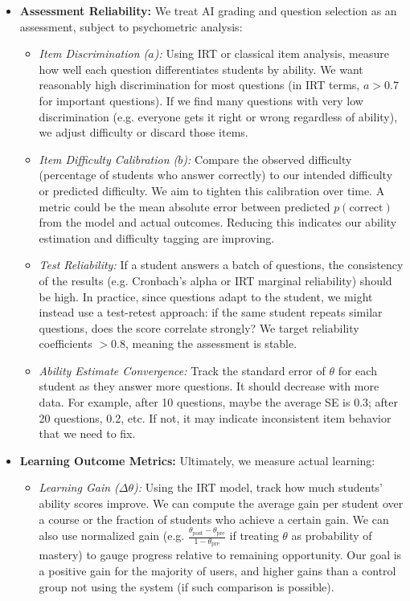 \documentclass[11pt]{article}
\begin{document}
\begin{itemize}
\begin{itemize}
    \end{itemize}
  \item \textbf{Assessment Reliability:} We treat AI grading and question selection as an assessment, subject to psychometric analysis:
    \begin{itemize}
      \item \textit{Item Discrimination ($a$):} Using IRT or classical item analysis, measure how well each question differentiates students by ability. We want reasonably high discrimination for most questions (in IRT terms, $a>0.7$ for important questions). If we find many questions with very low discrimination (e.g. everyone gets it right or wrong regardless of ability), we adjust difficulty or discard those items.
      \item \textit{Item Difficulty Calibration ($b$):} Compare the observed difficulty (percentage of students who answer correctly) to our intended difficulty or predicted difficulty. We aim to tighten this calibration over time. A metric could be the mean absolute error between predicted $p(\text{correct})$ from the model and actual outcomes. Reducing this indicates our ability estimation and difficulty tagging are improving.
      \item \textit{Test Reliability:} If a student answers a batch of questions, the consistency of the results (e.g. Cronbach’s alpha or IRT marginal reliability) should be high. In practice, since questions adapt to the student, we might instead use a test-retest approach: if the same student repeats similar questions, does the score correlate strongly? We target reliability coefficients $>0.8$, meaning the assessment is stable.
      \item \textit{Ability Estimate Convergence:} Track the standard error of $\theta$ for each student as they answer more questions. It should decrease with more data. For example, after 10 questions, maybe the average SE is 0.3; after 20 questions, 0.2, etc. If not, it may indicate inconsistent item behavior that we need to fix.
    \end{itemize}
  \item \textbf{Learning Outcome Metrics:} Ultimately, we measure actual learning:
    \begin{itemize}
      \item \textit{Learning Gain ($\Delta \theta$):} Using the IRT model, track how much students’ ability scores improve. We can compute the average gain per student over a course or the fraction of students who achieve a certain gain. We can also use normalized gain (e.g. $\frac{\theta_{\text{post}} - \theta_{\text{pre}}}{1 - \theta_{\text{pre}}}$ if treating $\theta$ as probability of mastery) to gauge progress relative to remaining opportunity. Our goal is a positive gain for the majority of users, and higher gains than a control group not using the system (if such comparison is possible).

\end{itemize}
\end{itemize}
\end{document}
